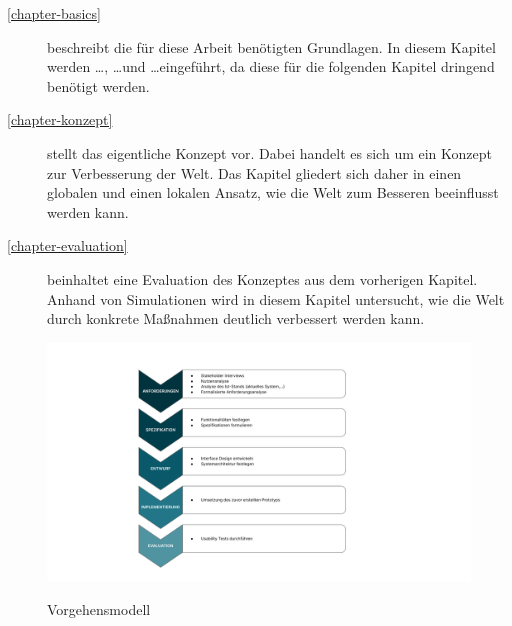 \begin{description}
  \item[\ref{chapter-basics}] beschreibt die für diese Arbeit benötigten Grundlagen. In diesem
  Kapitel werden \ldots, \ldots und \ldots eingeführt, da diese für die folgenden Kapitel dringend
  benötigt werden.
  \item[\ref{chapter-konzept}] stellt das eigentliche Konzept vor. Dabei handelt es sich um ein
  Konzept zur Verbesserung der Welt. Das Kapitel gliedert sich daher in einen globalen und einen
  lokalen Ansatz, wie die Welt zum Besseren beeinflusst werden kann.
  \item[\ref{chapter-evaluation}] beinhaltet eine Evaluation des Konzeptes aus dem vorherigen
  Kapitel. Anhand von Simulationen wird in diesem Kapitel untersucht, wie die Welt durch konkrete
  Maßnahmen deutlich verbessert werden kann.
\end{description}

\begin{figure}[h]
  \centering
  \includegraphics[scale=0.6]{Bilder/Vorgehensmodell.pptx.pdf}
  \label{fig:schablone}
  \caption[Vorgehensmodell]{Vorgehensmodell}
\end{figure}